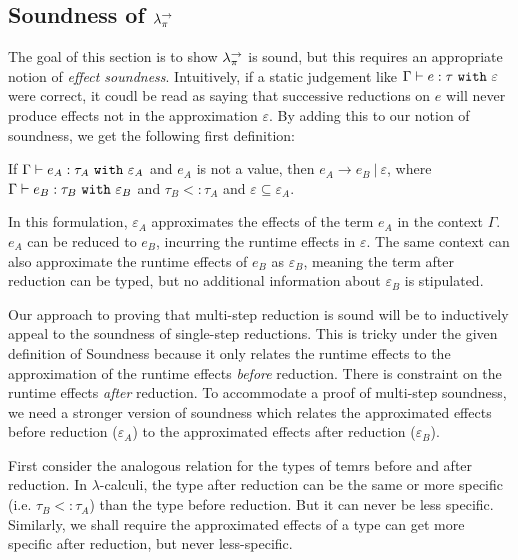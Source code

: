 \subsection{Soundness of $\lambda^{\rightarrow}_{\pi}$}

The goal of this section is to show $\lambda^{\rightarrow}_{\pi}$ is sound, but this requires an appropriate notion of \textit{effect soundness}. Intuitively, if a static judgement like $\Gamma \vdash e: \tau~\mathtt{with}~ \varepsilon$ were correct, it coudl be read as saying that successive reductions on $e$ will never produce effects not in the approximation $\varepsilon$. By adding this to our notion of soundness, we get the following first definition:

\begin{theorem}[Soundness 1]
If $ \Gamma \vdash  e_A:  \tau_A~\mathtt{with}~ \varepsilon_A$ and $ e_A$ is not a value, then $e_A \longrightarrow e_B~|~\varepsilon$, where $ \Gamma \vdash e_B:  \tau_B~\mathtt{with}~ \varepsilon_B$ and $ \tau_B <:  \tau_A$ and $\varepsilon \subseteq \varepsilon_A$.
\end{theorem}

In this formulation, $\varepsilon_A$ approximates the effects of the term $e_A$ in the context $\Gamma$. $e_A$ can be reduced to $e_B$, incurring the runtime effects in $\varepsilon$. The same context can also approximate the runtime effects of $e_B$ as $\varepsilon_B$, meaning the term after reduction can be typed, but no additional information about $\varepsilon_B$ is stipulated.

Our approach to proving that multi-step reduction is sound will be to inductively appeal to the soundness of single-step reductions. This is tricky under the given definition of Soundness because it only relates the runtime effects to the approximation of the runtime effects \textit{before} reduction. There is constraint on the runtime effects \textit{after} reduction. To accommodate a proof of multi-step soundness, we need a stronger version of soundness which relates the approximated effects before reduction ($\varepsilon_A$) to the approximated effects after reduction ($\varepsilon_B$).

First consider the analogous relation for the types of temrs before and after reduction. In $\lambda$-calculi, the type after reduction can be the same or more specific (i.e. $\tau_B <: \tau_A$) than the type before reduction. But it can never be less specific. Similarly, we shall require the approximated effects of a type can get more specific after reduction, but never less-specific.

